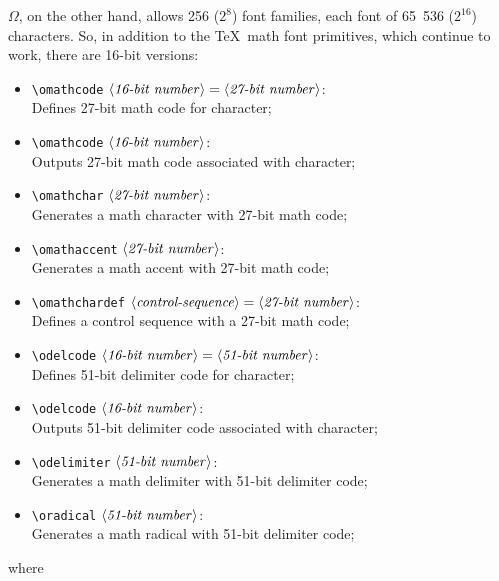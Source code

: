 \documentclass[fleqn]{article}
\newcommand{\OMEGA}{$\Omega$}
\newcommand{\bits}[1]{\langle\mbox{\emph{#1-bit number}}\rangle}
\newcommand{\showcs}{\langle\mbox{\emph{control-sequence}}\rangle}
\begin{document}
\OMEGA, on the other hand, allows 256 ($2^8$)
font families, each font of 65~536 ($2^{16}$) characters.
So, in addition to the \TeX\ math font primitives, which continue to work,
there are 16-bit versions:

\begin{itemize}
\item \verb|\omathcode| $\bits{16}=\bits{27}$:\\
Defines 27-bit math code for character;
\item \verb|\omathcode| $\bits{16}$:\\
Outputs 27-bit math code associated with character;
\item \verb|\omathchar| $\bits{27}$:\\
Generates a math character with 27-bit math code;
\item \verb|\omathaccent| $\bits{27}$:\\
Generates a math accent with 27-bit math code;
\item \verb|\omathchardef| $\showcs=\bits{27}$:\\
Defines a control sequence with a 27-bit math code;
\item \verb|\odelcode| $\bits{16}=\bits{51}$:\\
Defines 51-bit delimiter code for character;
\item \verb|\odelcode| $\bits{16}$:\\
Outputs 51-bit delimiter code associated with character;
\item \verb|\odelimiter| $\bits{51}$:\\
Generates a math delimiter with 51-bit delimiter code;
\item \verb|\oradical| $\bits{51}$:\\
Generates a math radical with 51-bit delimiter code;
\end{itemize}
where
\end{document}
